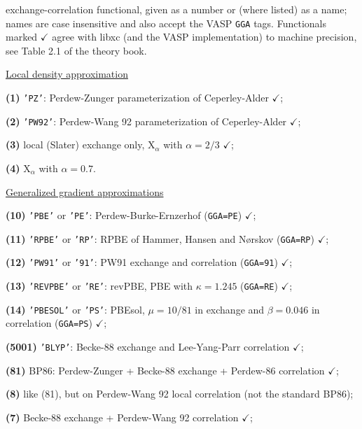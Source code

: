 \documentclass[final,12pt]{article}
\newcommand{\key}[1]{\hfill\break \makebox[1.5in][l]{\bf #1}\hfill\break}
\newcommand{\vdescr}[1]{\makebox[1in][l]{}\parbox[t]{110mm}{#1}\hfill\break}
\newcommand{\mbax}[1]{#1}
\begin{document}
\mbax{\key{TYPE} \vdescr{exchange-correlation functional, given as a
    number or (where listed) as a name; names are case insensitive and
    also accept the VASP {\tt GGA} tags. Functionals marked
    $\checkmark$ agree with libxc (and the VASP implementation) to
    machine precision, see Table 2.1 of the theory book.\hfill\break

    \underline{Local density approximation}

    {\bf(1)} {\tt 'PZ'}: Perdew-Zunger \cite{perdew81_prb23_5048}
    parameterization of Ceperley-Alder \cite{ceperley80_prl45_566}
    $\checkmark$;

    {\bf(2)} {\tt 'PW92'}: Perdew-Wang 92 \cite{perdew92_prb45_13244}
    parameterization of Ceperley-Alder $\checkmark$;

    {\bf(3)} local (Slater) exchange only, X$_\alpha$ with $\alpha=2/3$
    $\checkmark$;

    {\bf(4)} X$_\alpha$ with $\alpha=0.7$.

    \underline{Generalized gradient approximations}

    {\bf(10)} {\tt 'PBE'} or {\tt 'PE'}: Perdew-Burke-Ernzerhof
    \cite{perdew96_prl77_3865} ({\tt GGA=PE}) $\checkmark$;

    {\bf(11)} {\tt 'RPBE'} or {\tt 'RP'}: RPBE of Hammer, Hansen and
    N{\o}rskov \cite{hammer99_prb59_7413} ({\tt GGA=RP}) $\checkmark$;

    {\bf(12)} {\tt 'PW91'} or {\tt '91'}: PW91 exchange and correlation
    \cite{perdew92_prb46_6671} ({\tt GGA=91}) $\checkmark$;

    {\bf(13)} {\tt 'REVPBE'} or {\tt 'RE'}: revPBE, PBE with $\kappa=1.245$
    \cite{zhang98_prl80_890} ({\tt GGA=RE}) $\checkmark$;

    {\bf(14)} {\tt 'PBESOL'} or {\tt 'PS'}: PBEsol, $\mu=10/81$ in
    exchange and $\beta=0.046$ in correlation \cite{perdew08_prl100_136406}
    ({\tt GGA=PS}) $\checkmark$;

    {\bf(5001)} {\tt 'BLYP'}: Becke-88 exchange \cite{becke88_pra38_3098}
    and Lee-Yang-Parr correlation \cite{lee88_prb37_785} $\checkmark$;

    {\bf(81)} BP86: Perdew-Zunger + Becke-88 exchange + Perdew-86
    correlation \cite{perdew86_prb33_8822} $\checkmark$;

    {\bf(8)} like (81), but on Perdew-Wang 92 local correlation (not the
    standard BP86);

    {\bf(7)} Becke-88 exchange + Perdew-Wang 92 correlation $\checkmark$;

}}
\end{document}
